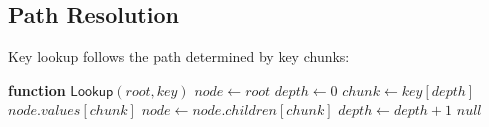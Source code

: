\subsection{Path Resolution}

Key lookup follows the path determined by key chunks:
\begin{algorithmic}[1]
\STATE \textbf{function} $\mathsf{Lookup}(root, key)$
\STATE $node \gets root$
\STATE $depth \gets 0$
    \STATE $chunk \gets key[depth]$
        \RETURN $node.values[chunk]$
    \ENDIF
    \STATE $node \gets node.children[chunk]$
    \STATE $depth \gets depth + 1$
\ENDWHILE
\RETURN $null$
\end{algorithmic}

